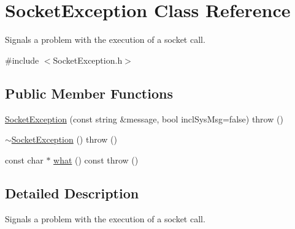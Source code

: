 \hypertarget{classSocketException}{
\section{SocketException Class Reference}
\label{classSocketException}
}


Signals a problem with the execution of a socket call.  


{\ttfamily \#include $<$SocketException.h$>$}\subsection*{Public Member Functions}
\begin{DoxyCompactItemize}
\item 
\hyperlink{classSocketException_abb5bcecd9d9e20868c237ec5a82cf5c3}{SocketException} (const string \&message, bool inclSysMsg=false)  throw ()
\item 
\hyperlink{classSocketException_a659557c899329aea01977c980c4db9b9}{$\sim$SocketException} ()  throw ()
\item 
const char $\ast$ \hyperlink{classSocketException_a06b7b3f186976bb5ec7e7bf007c4f0ac}{what} () const   throw ()
\end{DoxyCompactItemize}


\subsection{Detailed Description}
Signals a problem with the execution of a socket call. 

